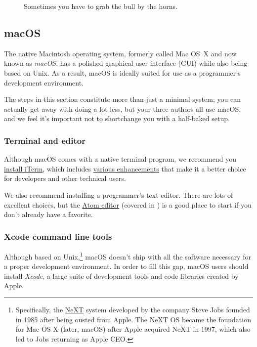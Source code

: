 \begin{figure}
\begin{center}
\end{center}
\caption{Sometimes you have to grab the bull by the horns.\label{fig:grab_bull_by_horns}}
\end{figure}

\subsection{macOS} %
\label{sec:macos}

The native Macintosh operating system, formerly called Mac OS~X and now known as \emph{macOS}, has a polished graphical user interface (GUI) while also being based on Unix. As a result, macOS is ideally suited for use as a  programmer's development environment.

The steps in this section constitute more than just a minimal system; you can actually get away with doing a lot less, but your three authors all use macOS, and we feel it's important not to shortchange you with a half-baked setup.

\subsubsection{Terminal and editor} %
\label{sec:terminal_and_editor}

Although macOS comes with a native terminal program, we recommend you \href{\href{https://www.iterm2.com/downloads.html}{iTerm}}{install iTerm}, which includes \href{https://www.iterm2.com/features.html}{various enhancements} that make it a better choice for developers and other technical users.

We also recommend installing a programmer's text editor. There are lots of excellent choices, but the \href{https://atom.io/}{Atom editor} (covered in ) is a good place to start if you don't already have a favorite.



\subsubsection{Xcode command line tools}
\label{sec:shiny_xcode}

Although based on Unix,\footnote{Specifically, the \href{https://en.wikipedia.org/wiki/NeXT}{NeXT} system developed by the company Steve Jobs founded in 1985 after being ousted from Apple. The NeXT OS became the foundation for Mac OS X (later, macOS) after Apple acquired NeXT in 1997, which also led to Jobs returning as Apple CEO.} macOS doesn't ship with all the software necessary for a proper development environment. In order to fill this gap, macOS users should install \emph{Xcode}, a large suite of development tools and code libraries created by Apple.

